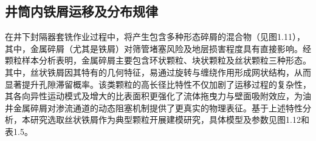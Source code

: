 \subsection{井筒内铁屑运移及分布规律}

在井下封隔器套铣作业过程中，将产生包含多种形态碎屑的混合物（见图1.11），其中，金属碎屑（尤其是铁屑）对筛管堵塞风险及地层损害程度具有直接影响。经颗粒样本分析表明，金属碎屑主要包含环状颗粒、块状颗粒及丝状颗粒三种形态。其中，丝状铁屑因其特有的几何特征，易通过旋转与缠绕作用形成网状结构，从而显著提升孔隙滞留概率。该类颗粒的高长径比特性不仅加剧了运移过程的复杂性，其各向异性运动模式及增大的比表面积更强化了流体拖曳力与壁面吸附效应，为油井金属碎屑对渗流通道的动态阻塞机制提供了更真实的物理表征。基于上述特性分析，本研究选取丝状铁屑作为典型颗粒开展建模研究，具体模型及参数见图1.12和表1.5。